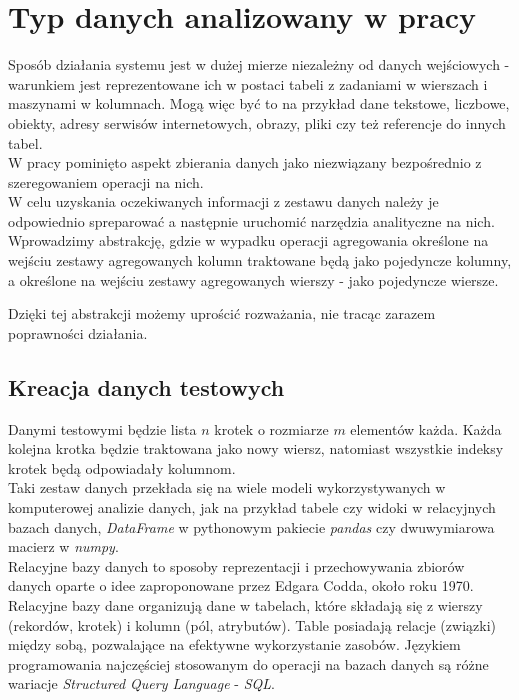 \documentclass[brudnopis]{xmgr}
\begin{document}
\chapter{Typ danych analizowany w pracy}

Sposób działania systemu jest w dużej mierze niezależny od danych wejściowych - warunkiem jest reprezentowane ich w postaci tabeli z zadaniami w wierszach i maszynami w kolumnach.
Mogą więc być to na przykład dane tekstowe, liczbowe, obiekty, adresy serwisów internetowych, obrazy, pliki czy też referencje do innych tabel.
\medskip\\

W pracy pominięto aspekt zbierania danych jako niezwiązany bezpośrednio z szeregowaniem operacji na nich.
\medskip\\

W celu uzyskania oczekiwanych informacji z zestawu danych należy je odpowiednio spreparować a następnie uruchomić narzędzia analityczne na nich.
\medskip\\

Wprowadzimy abstrakcję, gdzie w wypadku operacji agregowania określone na wejściu zestawy agregowanych kolumn traktowane będą jako pojedyncze kolumny, a określone na wejściu zestawy agregowanych wierszy - jako pojedyncze wiersze.

Dzięki tej abstrakcji możemy uprościć rozważania, nie tracąc zarazem poprawności działania.

\section{Kreacja danych testowych}

Danymi testowymi będzie lista $n$ krotek o rozmiarze $m$ elementów każda.
Każda kolejna krotka będzie traktowana jako nowy wiersz, natomiast wszystkie indeksy krotek będą odpowiadały kolumnom. 
\medskip\\

Taki zestaw danych przekłada się na wiele modeli wykorzystywanych w komputerowej analizie danych, jak na przykład tabele czy widoki w relacyjnych bazach danych, \emph{DataFrame} w pythonowym pakiecie \emph{pandas} czy dwuwymiarowa macierz w \emph{numpy}.
\medskip\\
Relacyjne bazy danych to sposoby reprezentacji i przechowywania zbiorów danych oparte o idee zaproponowane przez Edgara Codda, około roku 1970. Relacyjne bazy dane organizują dane w tabelach, które składają się z wierszy (rekordów, krotek) i kolumn (pól, atrybutów). Table posiadają relacje (związki) między sobą, pozwalające na efektywne wykorzystanie zasobów. Językiem programowania najczęściej stosowanym do operacji na bazach danych są różne wariacje \emph{Structured Query Language} - \emph{SQL}. \cite{RDB1:2020:X}\cite{RDB2:2020:X}\cite{RDB3:2010:X}
\end{document}
